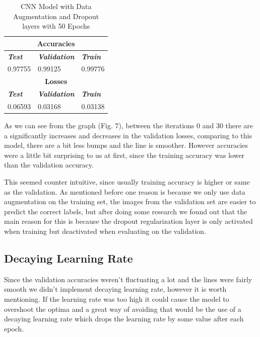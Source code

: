 \documentclass[conference]{IEEEtran}
\begin{document}
\begin{table}[htbp]
\caption{CNN Model with Data Augmentation and Dropout layers with 50 Epochs}
\begin{center}
\begin{tabular}{|p{2cm}|p{2cm}|p{2cm}|}
\hline
\multicolumn{3}{|c|}{\textbf{Accuracies}} \\
\hline
\textbf{\textit{Test}}& \textbf{\textit{Validation}}& \textbf{\textit{Train}} \\
\hline
0.97755 & 0.99125 & 0.99776 \\
\hline
\multicolumn{3}{|c|}{\textbf{Losses}} \\
\hline
\textbf{\textit{Test}}& \textbf{\textit{Validation}}& \textbf{\textit{Train}} \\
\hline
0.06593 & 0.03168 & 0.03138 \\
\hline
\end{tabular}
\end{center}
\end{table}


As we can see from the graph (Fig. 7), between the iterations 0 and 30 there are a significantly increases and decreases in the validation losses, comparing to this model, there are a bit less bumps and the line is smoother. However accuracies were a little bit surprising to us at first, since the training accuracy was lower than the validation accuracy.

This seemed counter intuitive, since usually training accuracy is higher or same as the validation. As mentioned before one reason is because we only use data augmentation on the training set, the images from the validation set are easier to predict the correct labels, but after doing some research we found out that the main reason for this is because the dropout regularization layer is only activated when training but deactivated when evaluating on the validation.


\subsection{Decaying Learning Rate}

Since the validation accuracies weren't fluctuating a lot and the lines were fairly smooth we didn't implement decaying learning rate, however it is worth mentioning. If the learning rate was too high it could cause the model to overshoot the optima and a great way of avoiding that would be the use of a decaying learning rate which drops the learning rate by some value after each epoch.
\end{document}
